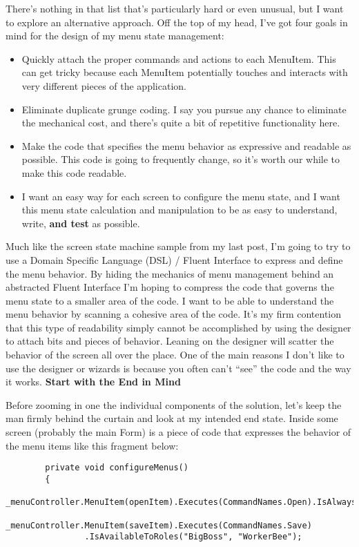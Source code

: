 \documentclass{article}
\begin{document}
{There's nothing in that list that's particularly hard or even unusual, but I want to explore an alternative approach.  Off the top of my head, I've got four goals in mind for the design of my menu state management:
 \begin{itemize}
     \item  Quickly attach the proper commands and actions to each MenuItem.  This can get tricky because each MenuItem potentially touches and interacts with very different pieces of the application.   
 \item  Eliminate duplicate grunge coding.  I say you pursue any chance to eliminate the mechanical cost, and there's quite a bit of repetitive functionality here.  
 \item  Make the code that specifies the menu behavior as expressive and readable as possible.  This code is going to frequently change, so it's worth our while to make this code readable.   
 \item  I want an easy way for each screen to configure the menu state, and I want this menu state calculation and manipulation to be as easy to understand, write, \textbf{and test} as possible.     
 \end{itemize}
 
Much like the screen state machine sample from my last post, I'm going to try to use a Domain Specific Language (DSL) / Fluent Interface to express and define the menu behavior.  By hiding the mechanics of menu management behind an abstracted Fluent Interface I'm hoping to compress the code that governs the menu state to a smaller area of the code.  I want to be able to understand the menu behavior by scanning a cohesive area of the code.  It's my firm contention that this type of readability simply cannot be accomplished by using the designer to attach bits and pieces of behavior.  Leaning on the designer will scatter the behavior of the screen all over the place.  One of the main reasons I don't like to use the designer or wizards is because you often can't “see” the code and the way it works.
\newline
\Large {\textbf{Start with the End in Mind}}

Before zooming in one the individual components of the solution, let's keep the man firmly behind the curtain and look at my intended end state.  Inside some screen (probably the main Form) is a piece of code that expresses the behavior of the menu items like this fragment below:
\newpage
\begin{lstlisting}
        private void configureMenus()
        {
            _menuController.MenuItem(openItem).Executes(CommandNames.Open).IsAlwaysEnabled();
            _menuController.MenuItem(saveItem).Executes(CommandNames.Save)
                .IsAvailableToRoles("BigBoss", "WorkerBee"); 


\end{lstlisting}}
\end{document}
